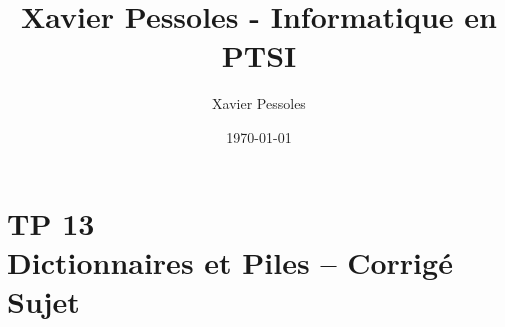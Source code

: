\documentclass[
	fontsize=10pt, %
	twoside=true, %
]{kaobook}
\newcommand{\repRel}{../../..}
\newcommand{\repStyle}{\repRel/Style}
\begin{document}

\titlehead{Xavier Pessoles - Informatique en PTSI}
\title[Xavier Pessoles - Informatique en PTSI]{Xavier Pessoles - Informatique en PTSI}
\author[XP]{Xavier Pessoles}
\date{\today}


\begingroup %
\endgroup

%
\mainmatter %
%
%
%
%


\setcounter{margintocdepth}{\sectiontocdepth}
\marginlayout
\graphicspath{{\repStyle/png}}

\pagestyle{xp.scrheadings}


%



\newcommand{\repExo}{}
\newcommand{\nomExo}{}

\livrettrue %
\livrettrue
\colletrue








\chapter*{TP 13 \\ 
Dictionnaires et Piles -- \ifprof Corrigé \else Sujet \fi}
\end{document}
